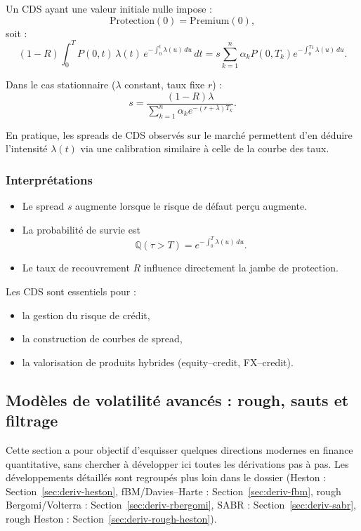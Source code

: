 \documentclass[11pt,a4paper]{article}
\newcommand{\1}{\mathbf{1}}
\begin{document}
Un CDS ayant une valeur initiale nulle impose :
\[
\mathrm{Protection}(0) = \mathrm{Premium}(0),
\]
soit :
\[
(1 - R)\int_0^T P(0,t)\, \lambda(t)\, e^{-\int_0^t \lambda(u)\,du}\, dt
=
s
\sum_{k=1}^{n}
\alpha_k P(0,T_k) e^{-\int_0^{T_k} \lambda(u)\,du}.
\]

Dans le cas stationnaire ($\lambda$ constant, taux fixe $r$) :
\[
s
=
\frac{ (1-R) \lambda }{ \sum_{k=1}^{n} \alpha_k e^{-(r+\lambda)T_k} }.
\]

En pratique, les spreads de CDS observés sur le marché permettent d'en déduire
l'intensit\'e $\lambda(t)$ via une calibration similaire à celle de la courbe
des taux.

\subsubsection{Interprétations}

\begin{itemize}
  \item Le spread $s$ augmente lorsque le risque de d\'efaut per\c{c}u augmente.
  \item La probabilit\'e de survie est
  \[
    \mathbb{Q}(\tau > T) = e^{-\int_0^T \lambda(u)\,du}.
  \]
  \item Le taux de recouvrement $R$ influence directement la jambe de protection.
\end{itemize}

Les CDS sont essentiels pour :
\begin{itemize}
  \item la gestion du risque de cr\'edit,
  \item la construction de courbes de spread,
  \item la valorisation de produits hybrides (equity--credit, FX--credit).
\end{itemize}


\subsection{Mod\`eles de volatilit\'e avanc\'es : rough, sauts et filtrage}

Cette section a pour objectif d'esquisser quelques directions modernes en finance
quantitative, sans chercher \`a d\'evelopper ici toutes les d\'erivations pas \`a pas.
Les d\'eveloppements d\'etaill\'es sont regroup\'es plus loin dans le dossier (Heston :
Section~\ref{sec:deriv-heston}, fBM/Davies--Harte : Section~\ref{sec:deriv-fbm},
rough Bergomi/Volterra : Section~\ref{sec:deriv-rbergomi}, SABR : Section~\ref{sec:deriv-sabr},
rough Heston : Section~\ref{sec:deriv-rough-heston}).
\end{document}
